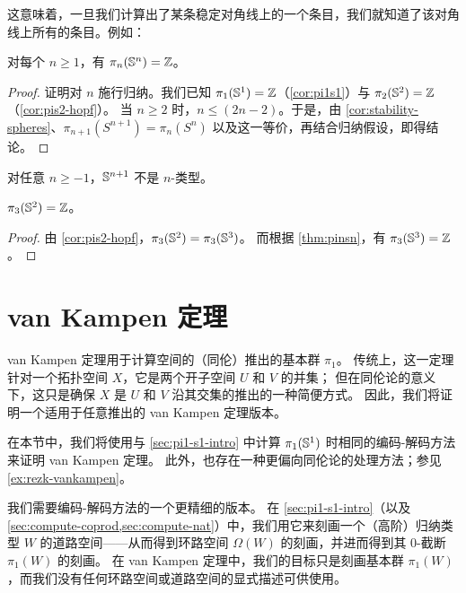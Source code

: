 这意味着，一旦我们计算出了某条稳定对角线上的一个条目，我们就知道了该对角线上所有的条目。例如：

\begin{thm}\label{thm:pinsn}
对每个 $n\geq 1$，有 $\pi_n(\mathbb{S}^n)=\mathbb{Z}$。
\end{thm}

\begin{proof}
证明对 $n$ 施行归纳。我们已知 $\pi_1(\mathbb{S} ^1) = \mathbb{Z}$（\cref{cor:pi1s1}）与 $\pi_2(\mathbb{S} ^2) = \mathbb{Z}$（\cref{cor:pis2-hopf}）。
当 $n \ge 2$ 时，$n \le (2n - 2)$。于是，由
\cref{cor:stability-spheres}、$\pi_{n+1}(S^{n+1}) = \pi_{n}(S^{n})$ 以及这一等价，再结合归纳假设，即得结论。
\end{proof}

\begin{cor}
对任意 $n\ge -1$，$\mathbb{S}^{n+1}$ 不是 $n$-类型。
\end{cor}

\begin{cor}\label{thm:pi3s2}
$\pi_3(\mathbb{S}^2)=\mathbb{Z}$。
\end{cor}

\begin{proof}
由 \cref{cor:pis2-hopf}，$\pi_3(\mathbb{S}^2) = \pi_3(\mathbb{S}^3)$。
而根据 \cref{thm:pinsn}，有 $\pi_3(\mathbb{S}^3) = \mathbb{Z}$。
\end{proof}

\section{van Kampen 定理}
\label{sec:van-kampen}

%
%

%
van Kampen 定理用于计算空间的（同伦）推出的基本群 $\pi_1$。
传统上，这一定理针对一个拓扑空间 $X$，它是两个开子空间 $U$ 和 $V$ 的并集；
但在同伦论的意义下，这只是确保 $X$ 是 $U$ 和 $V$ 沿其交集的推出的一种简便方式。
因此，我们将证明一个适用于任意推出的 van Kampen 定理版本。

在本节中，我们将使用与 \cref{sec:pi1-s1-intro} 中计算 $\pi_1(\mathbb{S}^1)$ 时相同的编码-解码方法来证明 van Kampen 定理。
此外，也存在一种更偏向同伦论的处理方法；参见 \cref{ex:rezk-vankampen}。

我们需要编码-解码方法的一个更精细的版本。
在 \cref{sec:pi1-s1-intro}（以及 \cref{sec:compute-coprod,sec:compute-nat}）中，我们用它来刻画一个（高阶）归纳类型 $W$ 的道路空间——从而得到环路空间 $\Omega(W)$ 的刻画，并进而得到其 0-截断 $\pi_1(W)$ 的刻画。
在 van Kampen 定理中，我们的目标只是刻画基本群 $\pi_1(W)$，而我们没有任何环路空间或道路空间的显式描述可供使用。


